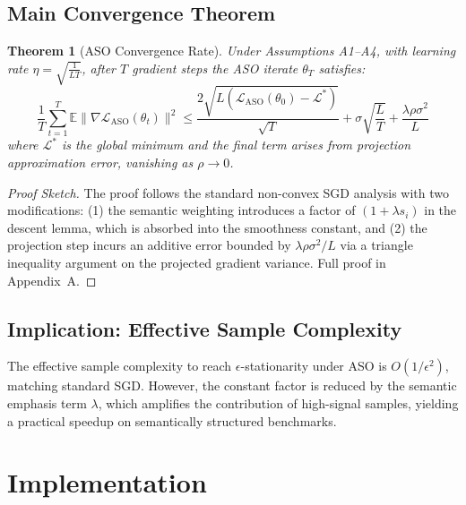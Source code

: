 \documentclass[11pt,a4paper]{article}
\newtheorem{theorem}{Theorem}
\begin{document}
\subsection{Main Convergence Theorem}

\begin{theorem}[ASO Convergence Rate]
\label{thm:convergence}
Under Assumptions A1--A4, with learning rate $\eta = \sqrt{\frac{1}{LT}}$, after $T$
gradient steps the ASO iterate $\theta_T$ satisfies:
\begin{equation}
    \frac{1}{T}\sum_{t=1}^{T} \mathbb{E}\|\nabla \mathcal{L}_{\text{ASO}}(\theta_t)\|^2
    \leq
    \frac{2\sqrt{L(\mathcal{L}_{\text{ASO}}(\theta_0) - \mathcal{L}^*)}}{\sqrt{T}}
    + \sigma\sqrt{\frac{L}{T}} + \frac{\lambda \rho \sigma^2}{L}
    \label{eq:convergence}
\end{equation}
where $\mathcal{L}^*$ is the global minimum and the final term arises from projection
approximation error, vanishing as $\rho \to 0$.
\end{theorem}

\begin{proof}[Proof Sketch]
The proof follows the standard non-convex SGD analysis with two modifications: (1) the
semantic weighting introduces a factor of $(1 + \lambda s_i)$ in the descent lemma,
which is absorbed into the smoothness constant, and (2) the projection step incurs an
additive error bounded by $\lambda \rho \sigma^2 / L$ via a triangle inequality argument
on the projected gradient variance. Full proof in Appendix~A.
\end{proof}

\subsection{Implication: Effective Sample Complexity}

The effective sample complexity to reach $\epsilon$-stationarity under ASO is
$O(1/\epsilon^2)$, matching standard SGD. However, the constant factor is reduced by
the semantic emphasis term $\lambda$, which amplifies the contribution of high-signal
samples, yielding a practical speedup on semantically structured benchmarks.

\section{Implementation}
\label{sec:implementation}
\end{document}
